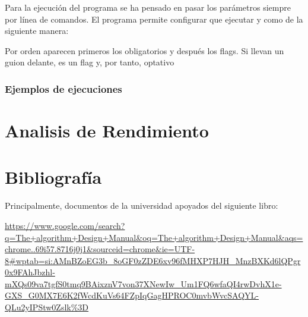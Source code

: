 \documentclass[a4paper, 12.5pt]{report}
\begin{document}
    Para la ejecución del programa se ha pensado en pasar los parámetros siempre por línea de comandos. El programa permite configurar que ejecutar y como de la siguiente manera:

    Por orden aparecen primeros los obligatorios y después los flags. Si llevan un guion delante, es un flag y, por tanto, optativo

    \subsubsection{Ejemplos de ejecuciones}


    \section{Analisis de Rendimiento}


    \section{Bibliografía}

    Principalmente, documentos de la universidad apoyados del siguiente libro:

    \url{https://www.google.com/search?q=The+algorithm+Design+Manual&oq=The+algorithm+Design+Manual&aqs=chrome..69i57.8716j0j1&sourceid=chrome&ie=UTF-8#wptab=si:AMnBZoEG3b_8oGF0zZDE6xv96fMHXP7HJH_MnzBXKd6lQPgr0x9FAhJbzhl-mXQs09va7tgfS0tmq9BAixznV7von37XNewIw_Um1FQ6wfaQI4rwDvhX1e-GXS_G0MX7E6K2fWcdKuVs64FZpIqGagHPROC0mvbWvcSAQYL-QLu2yIPStw0Zslk%3D}
\end{document}
